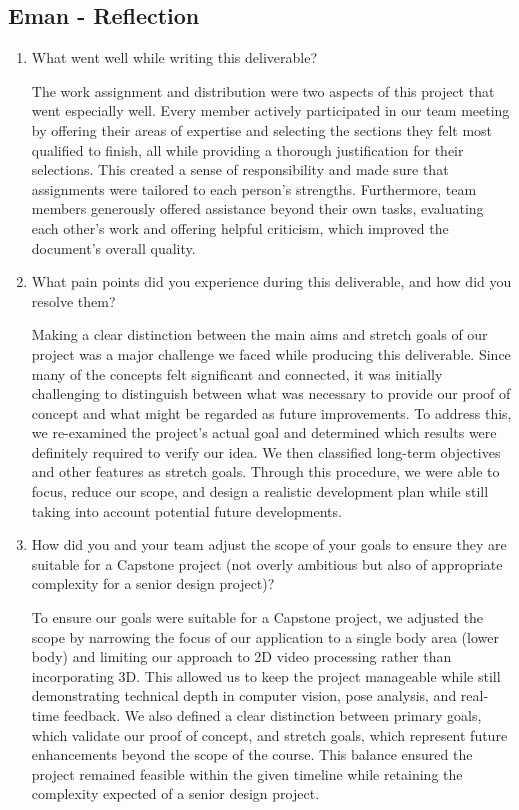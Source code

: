 \documentclass{article}
\begin{document}
\subsection*{Eman - Reflection}
\begin{enumerate}
    \item What went well while writing this deliverable? 

    The work assignment and distribution were two aspects of this project that went especially well. Every member actively
    participated in our team meeting by offering their areas of expertise and selecting the sections they felt most qualified
    to finish, all while providing a thorough justification for their selections. This created a sense of responsibility and
    made sure that assignments were tailored to each person's strengths. Furthermore, team members generously offered
    assistance beyond their own tasks, evaluating each other's work and offering helpful criticism, which improved the
    document's overall quality.

    \item What pain points did you experience during this deliverable, and how
    did you resolve them?

    Making a clear distinction between the main aims and stretch goals of our project was a major challenge we faced while
    producing this deliverable. Since many of the concepts felt significant and connected, it was initially challenging to
    distinguish between what was necessary to provide our proof of concept and what might be regarded as future improvements.
    To address this, we re-examined the project's actual goal and determined which results were definitely required to verify
    our idea. We then classified long-term objectives and other features as stretch goals. Through this procedure, we were
    able to focus, reduce our scope, and design a realistic development plan while still taking into account potential
    future developments.

    \item How did you and your team adjust the scope of your goals to ensure
    they are suitable for a Capstone project (not overly ambitious but also of
    appropriate complexity for a senior design project)?

    To ensure our goals were suitable for a Capstone project, we adjusted the scope by narrowing the focus of our application
    to a single body area (lower body) and limiting our approach to 2D video processing rather than incorporating 3D. This
    allowed us to keep the project manageable while still demonstrating technical depth in computer vision, pose analysis,
    and real-time feedback. We also defined a clear distinction between primary goals, which validate our proof of concept,
    and stretch goals, which represent future enhancements beyond the scope of the course. This balance ensured the project
    remained feasible within the given timeline while retaining the complexity expected of a senior design project.
    
\end{enumerate}  
\end{document}
